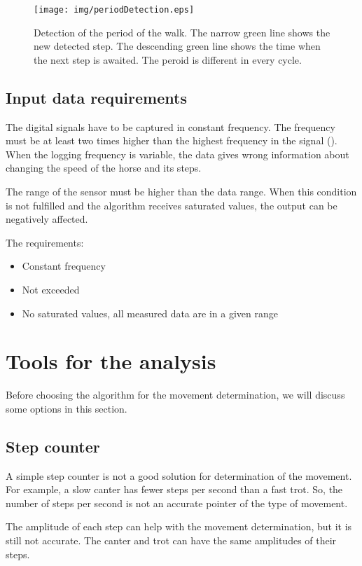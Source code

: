 \begin{figure}
    \centering
    \caption{Detection of the period of the walk. The narrow green line shows the new detected step. The descending green line shows the time when the next step is awaited. The peroid is different in every cycle.}
    \label{fig:graphPeriodicalMovement}
    \texttt{[image: img/periodDetection.eps]}
\end{figure}

\subsection{Input data requirements}
The digital signals have to be captured in constant frequency. \cite{DSPbook} The frequency must be at least two times higher than the highest frequency in the signal (). \cite{NyquistRate} When the logging frequency is variable, the data gives wrong information about changing the speed of the horse and its steps.

The range of the sensor must be higher than the data range. When this condition is not fulfilled and the algorithm receives saturated values, the output can be negatively affected.

The requirements:
\begin{itemize}
    \item Constant frequency
    \item Not exceeded 
    \item No saturated values, all measured data are in a given range
\end{itemize}

\section{Tools for the analysis}
Before choosing the algorithm for the movement determination, we will discuss some options in this section.

\subsection{Step counter}
\label{stepCounter}
A simple step counter is not a good solution for determination of the movement. For example, a slow canter has fewer steps per second than a fast trot. So, the number of steps per second is not an accurate pointer of the type of movement.

The amplitude of each step can help with the movement determination, but it is still not accurate. The canter and trot can have the same amplitudes of their steps.

